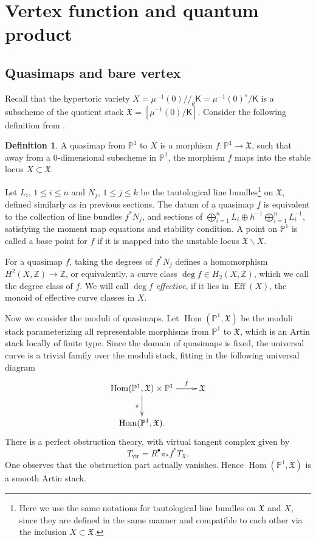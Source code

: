 \documentclass[10pt]{amsart}
\theoremstyle{definition}
\def\ZZ{{\mathbb{Z}}}
\def\PP{{\mathbb{P}}}
\newcommand{\Eff}{\operatorname{Eff}}
\newcommand{\Hom}{\operatorname{Hom}}
\newcommand{\vir}{\mathrm{vir}}
\newcommand{\fX}{\mathfrak{X}}
\newcommand{\bK}{\mathsf{K}}
\theoremstyle{definition}
\newtheorem{Definition}{Definition}[section]
\numberwithin{equation}{section}
\theoremstyle{Theorem}
\begin{document}



\section{Vertex function and quantum product}




\subsection{Quasimaps and bare vertex}

Recall that the hypertoric variety $X = \mu^{-1}(0) /\!/_\theta \bK = \mu^{-1}(0)^s / \bK$ is a subscheme of the quotient stack $\fX = [\mu^{-1} (0) / \bK ] $. Consider the following definition from \cite{Oko}.

\begin{Definition}
A quasimap from $\PP^1$ to $X$ is a morphism $f: \PP^1 \to \fX$, such that away from a $0$-dimensional subscheme in $\PP^1$, the morphism $f$ maps into the stable locus $X\subset \fX$.
\end{Definition}

Let $L_i$, $1\leq i\leq n$ and $N_j$, $1\leq j \leq k$ be the tautological line bundles\footnote{Here we use the same notations for tautological line bundles on $\fX$ and $X$, since they are defined in the same manner and compatible to each other via the inclusion $X \subset \fX$. } on $\fX$, defined similarly as in previous sections. The datum of a quasimap $f$ is equivalent to the collection of line bundles $f^* N_j$, and sections of $\bigoplus_{i=1}^n L_i \oplus \hbar^{-1} \bigoplus_{i=1}^n L_i^{-1}$, satisfying the moment map equations and stability condition. A point on $\PP^1$ is called a base point for $f$ if it is mapped into the unstable locus $\fX \backslash X$.

For a quasimap $f$, taking the degrees of $f^* N_j$ defines a homomorphism $H^2 (X, \ZZ) \to \ZZ$, or equivalently, a curve class $\deg f \in H_2 (X, \ZZ)$, which we call the degree class of $f$. We will call $\deg f$ \emph{effective}, if it lies in $\Eff (X)$, the monoid of effective curve classes in $X$.

Now we consider the moduli of quasimaps. Let $\Hom(\PP^1, \fX)$ be the moduli stack parameterizing all representable morphisms from $\PP^1$ to $\fX$, which is an Artin stack locally of finite type. Since the domain of quasimaps is fixed, the universal curve is a trivial family over the moduli stack, fitting in the following universal diagram
$$\xymatrix{
	\Hom(\PP^1, \fX) \times \PP^1 \ar[r]^-f \ar[d]_\pi & \fX \\
	\Hom(\PP^1, \fX).
}$$
There is a perfect obstruction theory, with virtual tangent complex given by
$$T_\vir = R^\bullet \pi_* f^* T_\fX.$$
One observes that the obstruction part actually vanishes. Hence $\Hom(\PP^1, \fX)$ is a smooth Artin stack.
\end{document}
